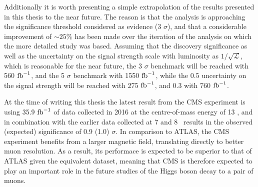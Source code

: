 Additionally it is worth presenting a simple extrapolation of the results
presented in this thesis to the near future. The reason is that the
analysis is approaching the significance threshold considered as 
evidence (3 $\sigma$), and that a considerable improvement of $\sim 25\%$
has been made over the iteration of the analysis on which the more detailed
study was based. Assuming that the discovery significance as well as the
uncertainty on the signal strength scale with luminosity as
$1/\sqrt{\mathcal{L}}$, which is reasonable for the near future,
the 3 $\sigma$ benchmark will be reached with 560 $\text{fb}^{-1}$, and the 5 $\sigma$
benchmark with 1550 $\text{fb}^{-1}$, while the 0.5 uncertainty on the signal strength
will be reached with 275 $\text{fb}^{-1}$, and 0.3 with 760 $\text{fb}^{-1}$.

At the time of writing this thesis the latest result from the CMS experiment
is using 35.9 $\text{fb}^{-1}$ of data collected in 2016 at the centre-of-mass energy
of 13 \TeV, and in combination with the earlier data collected at 7 and 8 \TeV~results
in the observed (expected) significance of 0.9 (1.0) $\sigma$.
In comparison to ATLAS, the CMS experiment benefits from a larger
magnetic field, translating directly to better muon resolution.
As a result, its performace is expected to be superior to that of ATLAS
given the equivalent dataset, meaning that CMS is therefore expected to play an
important role in the future studies of the Higgs boson decay to a pair
of muons.






